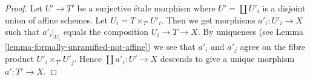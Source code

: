 \documentclass[10pt,a4paper]{amsart}
\theoremstyle{plain}
\theoremstyle{definition}
\theoremstyle{remark}
\numberwithin{equation}{subsection}
\begin{document}
\begin{proof}
Let $U' \to T'$ be a surjective \'etale morphism where $U' = \coprod U'_i$
is a disjoint union of affine schemes. Let
$U_i = T \times_{T'} U'_i$. Then we get morphisms
$a'_i : U'_i \to X$ such that $a'_i|_{U_i}$ equals the composition
$U_i \to T \to X$. By uniqueness (see
Lemma \ref{lemma-formally-unramified-not-affine})
we see that $a'_i$ and $a'_j$ agree on the fibre product
$U'_i \times_{T'} U'_j$. Hence $\coprod a'_i : U' \to X$
descends to give a unique morphism $a' : T' \to X$.
\end{proof}
\end{document}
